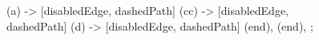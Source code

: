 \documentclass[../../article.tex]{subfiles}
\begin{document}
\begin{figure}
\begin{styledtikz}
\begin{scope}[local bounding box=graph1, spring layout]
{                (a) -> [disabledEdge, dashedPath] (cc) -> [disabledEdge, dashedPath] (d) -> [disabledEdge, dashedPath] (end),
                (end),
            };
        \end{scope}


\end{styledtikz}
\end{figure}
\end{document}
